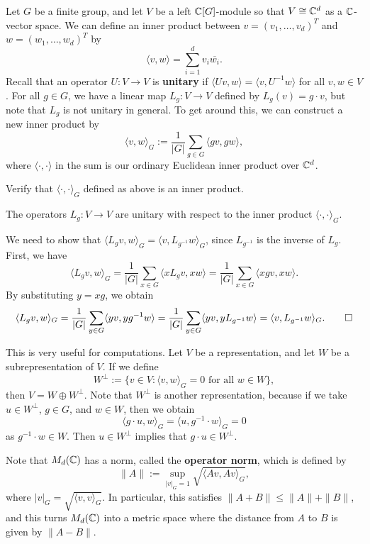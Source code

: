 Let $G$ be a finite group, and let $V$ be a left $\mathbb{C}[G]$-module so that 
$V \cong \mathbb{C}^d$ as a $\mathbb{C}$-vector space. We can define an inner product 
between $v = (v_1, \dots, v_d)^T$ and $w = (w_1, \dots, w_d)^T$ by 
\[ \langle v, w \rangle = \sum_{i=1}^d v_i \overline{w_i}. \] 
Recall that an operator $U : V \to V$ is \textbf{unitary} if 
$\langle Uv, w \rangle = \langle v, U^{-1}w \rangle$ for all $v, w \in V$. 
For all $g \in G$, we have a linear map $L_g : V \to V$ defined by 
$L_g(v) = g \cdot v$, but note that $L_g$ is not unitary in general. 
To get around this, we can construct a new inner product by 
\[ \langle v, w \rangle_G := \frac{1}{|G|} \sum_{g \in G} \langle gv, gw \rangle, \] 
where $\langle \cdot, \cdot \rangle$ in the sum is our ordinary Euclidean inner 
product over $\mathbb{C}^d$. 

\begin{exercise}{}
    Verify that $\langle \cdot, \cdot \rangle_G$ defined as above is an inner product. 
\end{exercise}

\begin{prop}{}
    The operators $L_g : V \to V$ are unitary with respect to the inner product 
    $\langle \cdot, \cdot \rangle_G$. 
\end{prop}
\begin{pf}
    We need to show that $\langle L_gv, w \rangle_G = \langle v, L_{g^{-1}}w \rangle_G$, 
    since $L_{g^{-1}}$ is the inverse of $L_g$. First, we have 
    \[ \langle L_gv, w \rangle_G = \frac{1}{|G|} \sum_{x\in G} \langle xL_g v, xw \rangle 
    = \frac{1}{|G|} \sum_{x\in G} \langle xgv, xw \rangle. \] 
    By substituting $y = xg$, we obtain 
    \[ \langle L_gv, w \rangle_G = \frac{1}{|G|} \sum_{y \in G} \langle yv, yg^{-1}w \rangle 
    = \frac{1}{|G|} \sum_{y\in G} \langle yv, yL_{g^{-1}}w \rangle = \langle v, L_{g^{-1}}w \rangle_G. 
    \qedhere \] 
\end{pf}
This is very useful for computations. Let $V$ be a representation, and let
$W$ be a subrepresentation of $V$. If we define 
\[ W^{\perp} := \{v \in V : \langle v, w \rangle_G = 0 \text{ for all } w \in W\}, \] 
then $V = W \oplus W^{\perp}$. Note that $W^{\perp}$ is another representation, 
because if we take $u \in W^{\perp}$, $g \in G$, and $w \in W$, then we obtain 
\[ \langle g \cdot u, w \rangle_G = \langle u, g^{-1} \cdot w \rangle_G = 0 \] 
as $g^{-1} \cdot w \in W$. Then $u \in W^{\perp}$ implies that $g \cdot u \in W^{\perp}$. 

Note that $M_d(\mathbb{C})$ has a norm, called the \textbf{operator norm}, which is defined by 
\[ \|A\| := \sup_{|v|_G = 1} \sqrt{\langle Av, Av \rangle_G}, \] 
where $|v|_G = \sqrt{\langle v, v \rangle_G}$. In particular, this 
satisfies $\|A + B\| \leq \|A\| + \|B\|$, and this turns $M_d(\mathbb{C})$ into 
a metric space where the distance from $A$ to $B$ is given by $\|A - B\|$. 

